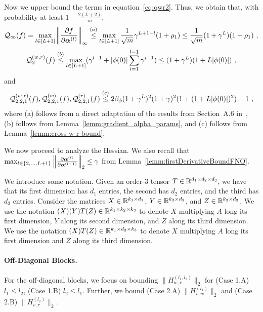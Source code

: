 Now we upper bound the terms in equation~\eqref{eq:qwr2}. Thus, we obtain that, with probability at least $1-\frac{2(L+2)}{m}$,
\begin{equation}
\label{eq:Q_1}
 {\cal Q}_{\infty}(f)=\max_{l\in[L+1]}\left\| \frac{\partial f}{\partial \boldsymbol{\alpha}^{(l)}} \right\|_{\infty}\overset{(a)}{\leq}
 \max_{l\in[L+1]}\frac{1}{\sqrt{m}}\gamma^{L+1-l}(1+\rho_1)\leq
 \frac{1}{\sqrt{m}}(1+\gamma^{L})(1+\rho_1)~,
\end{equation}
%
%
\begin{equation}
\label{eq:Q_2}
{\cal Q}^{(w,r)}_2(f)\overset{(b)}{\leq}\max_{l\in[L+1]}(\gamma^{l-1}+|\phi(0)|\sum^{l-1}_{i=1}\gamma^{i-1})
\leq (1+\gamma^L)(1+L|\phi(0)|)~,
\end{equation}
and 
%
\begin{equation}
\label{eq:Q_3}
{\cal Q}^{(w,r)}_{2,2,1}(f),{\cal Q}^{(w)}_{2,2,1}(f),{\cal Q}^{(r)}_{2,2,1}(f)  \overset{(c)}{\leq} 
2\beta_{\phi}(1+\gamma^L)^2(1+\gamma)^2(1+(1+L|\phi(0)|)^2)+1~,
\end{equation}
%
where (a) follows from a direct adaptation of the results from Section~A.6 in~\cite{banerjee2022restricted}, (b) follows from Lemma~\ref{lemm:gradient_alpha_params}, and (c) follows from Lemma~\ref{lemm:cross-w-r-bound}.

We now proceed to analyze the Hessian. We also recall that $\max_{l \in \{2,\dots,L+1\}} \left\| \frac{\partial \boldsymbol{\alpha}^{(l)}}{\partial \boldsymbol{\alpha}^{(l-1)}} \right\|_2 \leq \gamma$ from Lemma~\ref{lemm:firstDerivativeBoundFNO}. 

We introduce some notation. Given an order-3 tensor $T \in {\mathbb{R}}^{d_1 \times d_2 \times d_3}$, we have that its first dimension has $d_1$ entries, the second has $d_2$ entries, and the third has $d_3$ entries. Consider the matrices $X\in{\mathbb{R}}^{k_1\times d_1}$, $Y\in{\mathbb{R}}^{k_2\times d_2}$, and $Z\in{\mathbb{R}}^{k_3\times d_3}$. We use the notation $(X)(Y)T(Z)\in{\mathbb{R}}^{k_1\times k_2\times k_3}$ to denote $X$ multiplying $A$ long its first dimension, $Y$ along its second dimension, and $Z$ along its third dimension. We use the notation $(X)T(Z)\in{\mathbb{R}}^{k_1\times d_2\times k_3}$ to denote $X$ multiplying $A$ long its first dimension and $Z$ along its third dimension.



\paragraph{Off-Diagonal Blocks.} For the off-diagonal blocks, we focus on bounding $\| H_{w,r}^{(l_1,l_2)} \|_2$ for (Case 1.A) $l_1 \leq l_2$, (Case 1.B) $l_2 \leq l_1$. Further, we bound (Case 2.A) $\| H_{v,w}^{(l_1)} \|_2$ and (Case 2.B) $\| H_{v,r}^{(l_2)} \|_2$.


